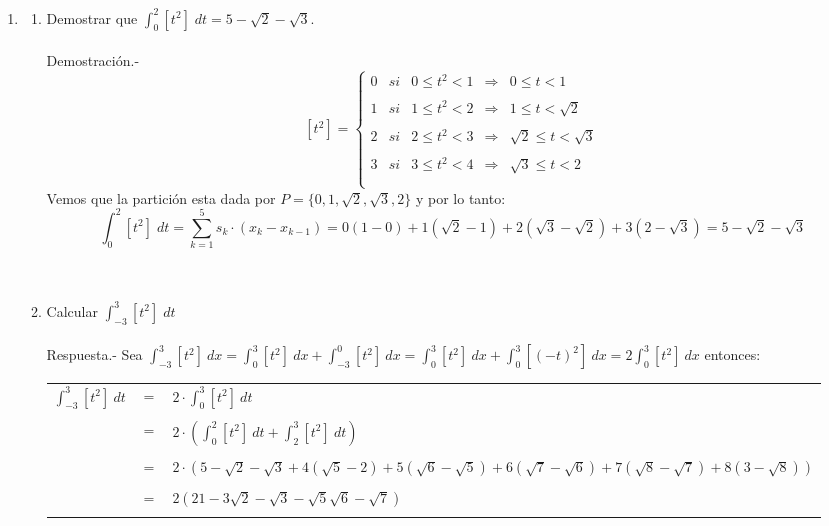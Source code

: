 \begin{enumerate}
\begin{enumerate}[\bfseries (a)]
    \end{enumerate}

    \item
    \begin{enumerate}[\bfseries (a)]
	
	\item Demostrar que $\displaystyle\int_{0}^{2} [t^2] \; dt = 5 - \sqrt{2} - \sqrt{3}.$\\\\
	    Demostración.-\; 
	    $$\left[t^2\right]=\left\{\begin{array}{rclcl}
		  0&si&0\leq t^2 < 1&\Rightarrow&0\leq t < 1\\
		\\1&si&1\leq t^2 < 2&\Rightarrow&1\leq t < \sqrt{2}\\
		\\2&si&2\leq t^2 < 3&\Rightarrow&\sqrt{2}\leq t < \sqrt{3}\\
		\\3&si&3\leq t^2 < 4&\Rightarrow&\sqrt{3} \leq t<2\\\\
	    \end{array}\right.$$
	    Vemos que la partición esta dada por $P=\lbrace 0,1,\sqrt{2},\sqrt{3},2 \rbrace$ y por lo tanto:
	    $$\displaystyle\int_{0}^{2} \left[t^2\right] \; dt = \sum\limits_{k=1}^{5} s_k \cdot (x_k - x_{k-1}) = 0(1-0)+1(\sqrt{2}-1) + 2(\sqrt{3}-\sqrt{2}) + 3(2-\sqrt{3})=5 - \sqrt{2} - \sqrt{3}$$\\\\
	
	\item Calcular $\displaystyle\int_{-3}^{3} \left[ t^2 \right] \; dt$\\\\
	    Respuesta.-\; Sea $\displaystyle\int_{-3}^{3} [t^{2}] \ dx = \int_{0}^{3} [t^{2}] \ dx + \int_{-3}^{0} [t^{2}] \ dx = \int_{0}^{3} [t^{2}] \ dx + \int_{0}^{3} [(-t)^{2}] \ dx = 2 \int_{0}^{3} [t^{2}] \ dx$ entonces:\\

	    \begin{tabular}{rcl}
		$\displaystyle\int_{-3}^{3} \left[t^2\right] \ dt$&$=$&$ \displaystyle2\cdot \int_{0}^{3} \left[t^2\right] \ dt$\\\\
		&$=$&$\displaystyle2\cdot \left( \int_{0}^{2} \left[t^2\right] \ dt + \int_{2}^{3} \left[t^2\right] \ dt\right)$\\\\
		&$=$&$ 2\cdot \left(5 - \sqrt{2} - \sqrt{3} + 4(\sqrt{5}-2) + 5(\sqrt{6}-\sqrt{5}) + 6(\sqrt{7} - \sqrt{6}) + 7(\sqrt{8} - \sqrt{7}) + 8(3 - \sqrt{8})\right)$\\\\
		&$=$&$2\left(21 - 3\sqrt{2} - \sqrt{3} - \sqrt{5} \sqrt{6} - \sqrt{7}\right)$\\\\
	    \end{tabular}


\end{enumerate}
\end{enumerate}
